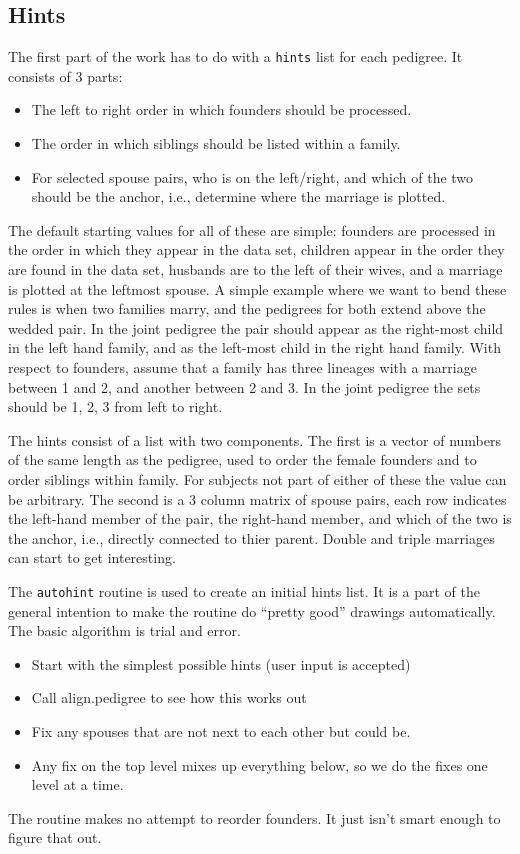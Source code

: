 \documentclass{article}
\begin{document}
\subsection{Hints}

The first part of the work has to do with a {\tt{}hints} list for each
pedigree.  It consists of 3 parts:
\begin{itemize}
  \item The left to right order in which founders should be processed.
  \item The order in which siblings should be listed within a family.
  \item For selected spouse pairs, who is on the left/right, and which of the
    two should be the anchor, i.e., determine where the marriage is plotted.
    \end{itemize}
The default starting values for all of these are simple: founders are 
processed in the order in which they appear in the data set, 
children appear in the order they are found in the data set,
husbands are to the left of their wives, and a marriage is plotted
at the leftmost spouse.
A simple example where we want to bend these rules is when two families
marry, and the pedigrees for both extend above the wedded pair.  
In the joint pedigree the
pair should appear as the right-most child in the left hand family, and
as the left-most child in the right hand family.
With respect to founders, assume that a family has three lineages with
a marriage between 1 and 2, and another between 2 and 3.  In the joint
pedigree the sets should be 1, 2, 3 from left to right.  

The hints consist of a list with two components.
The first is a vector of numbers of the same length as the pedigree,
used to order the female founders and to order siblings within
family.  For subjects not part of either of these the value can be 
arbitrary.  
The second is a 3 column matrix of spouse pairs, each row indicates the
left-hand member of the pair, the right-hand member, and which of the two
is the anchor, i.e., directly connected to thier parent.
Double and triple marriages can start to get interesting.


The {\tt{}autohint} routine is used to create an initial hints list.
It is a part of the general intention to make the routine do
``pretty good'' drawings automatically.                 
The basic algorithm is trial and error. 
\begin{itemize}
  \item Start with the simplest possible hints (user input is accepted)
  \item Call align.pedigree to see how this works out
  \item Fix any spouses that are not next to each other but could be.
  \item Any fix on the top level mixes up everything below, so we do the
    fixes one level at a time.
\end{itemize}
The routine makes no attempt to reorder founders.  It just isn't smart enough%
to figure that out.
\end{document}
